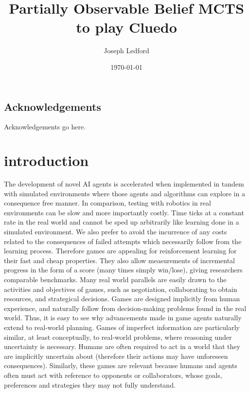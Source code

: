 \documentclass[msc, deptreport, ai, romanprepages]{infthesis}
\begin{document}
\title{Partially Observable Belief MCTS to play Cluedo}

\author{Joseph Ledford}


\date{\today}


\maketitle

\section*{Acknowledgements}
Acknowledgements go here. 

\tableofcontents

\chapter{introduction}
The development of novel AI agents is accelerated when implemented in tandem with simulated environments where those agents and algorithms can explore in a consequence free manner. In comparison, testing with robotics in real environments can be slow and more importantly costly. Time ticks at a constant rate in the real world and cannot be sped up arbitrarily like learning done in a simulated environment. We also prefer to avoid the incurrence of any costs related to the consequences of failed attempts which necessarily follow from the learning process. Therefore games are appealing for reinforcement learning for their fast and cheap properties. They also allow measurements of incremental progress in the form of a score (many times simply win/lose), giving researchers comparable benchmarks. Many real world parallels are easily drawn to the activities and objectives of games, such as negotiation, collaborating to obtain resources, and strategical decisions. Games are designed implicitly from human experience, and naturally follow from decision-making problems found in the real world. Thus, it is easy to see why advancements made in game agents naturally extend to real-world planning. Games of imperfect information are particularly similar, at least conceptually, to real-world problems, where reasoning under uncertainty is necessary. Humans are often required to act in a world that they are implicitly uncertain about (therefore their actions may have unforeseen consequences). Similarly, these games are relevant because humans and agents often must act with reference to opponents or collaborators, whose goals, preferences and strategies they may not fully understand. \\
\end{document}
